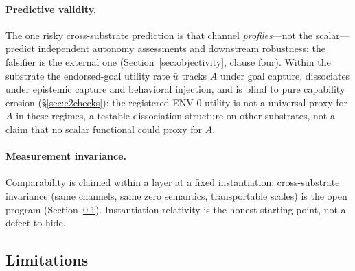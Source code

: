 \paragraph{Predictive validity.} The one risky cross-substrate prediction is
that channel \emph{profiles}---not the scalar---predict independent autonomy
assessments and downstream robustness; the falsifier is the external one
(Section~\ref{sec:objectivity}, clause four). Within the substrate the
endorsed-goal utility rate $\bar u$ tracks $A$ under goal capture, dissociates
under epistemic capture and behavioral injection, and is blind to pure
capability erosion (\S\ref{sec:e2checks}): the registered ENV-0 utility is not a
universal proxy for $A$ in these regimes, a testable dissociation structure on
other substrates, not a claim that no scalar functional could proxy for $A$.

\paragraph{Measurement invariance.} Comparability is claimed within a layer at a
fixed instantiation; cross-substrate invariance (same channels, same zero
semantics, transportable scales) is the open program
(Section~\ref{sec:limitations}). Instantiation-relativity is the honest starting
point, not a defect to hide.

\subsection{Limitations}\label{sec:limitations}

